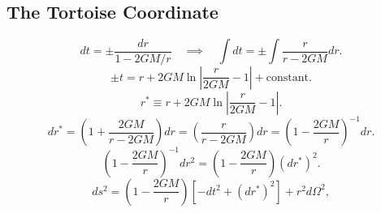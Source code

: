 \documentclass[11pt, a4paper]{report}
\begin{document}
\subsection{The Tortoise Coordinate}
\begin{equation}
dt = \pm \frac{dr}{1 - 2GM/r} \quad \implies \quad \int dt = \pm \int \frac{r}{r - 2GM} dr.
\end{equation}
\begin{equation}
\pm t = r + 2GM \ln\left| \frac{r}{2GM} - 1 \right| + \text{constant}.
\end{equation}
\begin{equation}
\label{eq:tortoise_def}
r^{*} \equiv r + 2GM \ln\left| \frac{r}{2GM} - 1 \right|.
\end{equation}
\begin{equation}
dr^{*} = \left( 1 + \frac{2GM}{r - 2GM} \right) dr = \left( \frac{r}{r - 2GM} \right) dr = \left( 1 - \frac{2GM}{r} \right)^{-1} dr.
\end{equation}
\begin{equation}
\left( 1 - \frac{2GM}{r} \right)^{-1} dr^{2} = \left( 1 - \frac{2GM}{r} \right) (dr^{*})^{2}.
\end{equation}
\begin{equation}
ds^{2} = \left( 1 - \frac{2GM}{r} \right) \left[ -dt^{2} + (dr^{*})^{2} \right] + r^{2} d\Omega^{2},
\end{equation}
\end{document}
